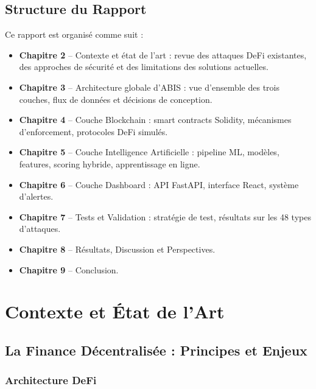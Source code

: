 \documentclass[12pt,a4paper]{report}
\begin{document}
\section{Structure du Rapport}

Ce rapport est organisé comme suit :

\begin{itemize}
  \item \textbf{Chapitre 2} -- Contexte et état de l'art : revue des attaques DeFi existantes, des approches de sécurité et des limitations des solutions actuelles.
  \item \textbf{Chapitre 3} -- Architecture globale d'ABIS : vue d'ensemble des trois couches, flux de données et décisions de conception.
  \item \textbf{Chapitre 4} -- Couche Blockchain : smart contracts Solidity, mécanismes d'enforcement, protocoles DeFi simulés.
  \item \textbf{Chapitre 5} -- Couche Intelligence Artificielle : pipeline ML, modèles, features, scoring hybride, apprentissage en ligne.
  \item \textbf{Chapitre 6} -- Couche Dashboard : API FastAPI, interface React, système d'alertes.
  \item \textbf{Chapitre 7} -- Tests et Validation : stratégie de test, résultats sur les 48 types d'attaques.
  \item \textbf{Chapitre 8} -- Résultats, Discussion et Perspectives.
  \item \textbf{Chapitre 9} -- Conclusion.
\end{itemize}

\chapter{Contexte et État de l'Art}
\vspace{0pt}
\vspace{1cm}

\section{La Finance Décentralisée : Principes et Enjeux}

\subsection{Architecture DeFi}
\end{document}

